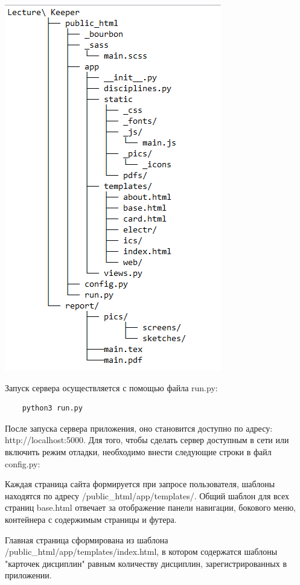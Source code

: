 \includegraphics{codes/file_struct.png}

Запуск сервера осуществляется с помощью файла run.py:

\begin{lstlisting}
	python3 run.py
\end{lstlisting}

После запуска сервера приложения, оно становится доступно по адресу: http://localhost:5000. Для того, чтобы сделать сервер доступным в сети или включить режим отладки, необходимо внести следующие строки в файл config.py:
%

Каждая страница сайта формируется при запросе пользователя, шаблоны находятся по адресу /public\_html/app/templates/. Общий шаблон для всех страниц base.html отвечает за отображение панели навигации, бокового меню, контейнера с содержимым страницы и футера.

Главная страница сформирована из шаблона /public\_html/app/templates/index.html, в котором содержатся шаблоны "карточек дисциплин" равным количеству дисциплин, зарегистрированных в приложении.

